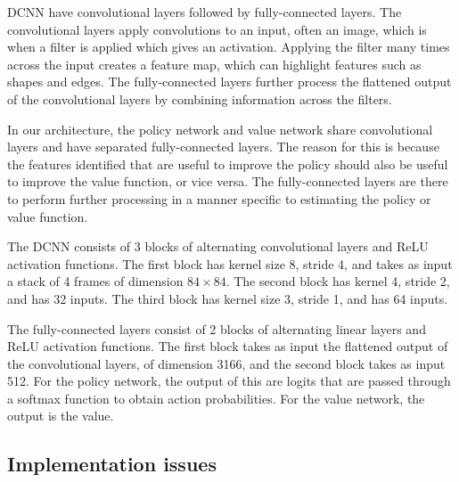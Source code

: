\documentclass[12pt,a4paper]{article}
\begin{document}
DCNN have convolutional layers followed by fully-connected layers. The convolutional layers apply convolutions to an input, often an image, which is when a filter is applied which gives an activation. Applying the filter many times across the input creates a feature map, which can highlight features such as shapes and edges. The fully-connected layers further process the flattened output of the convolutional layers by combining information across the filters.

In our architecture, the policy network and value network share convolutional layers and have separated fully-connected layers. The reason for this is because the features identified that are useful to improve the policy should also be useful to improve the value function, or vice versa. The fully-connected layers are there to perform further processing in a manner specific to estimating the policy or value function. 

The DCNN consists of 3 blocks of alternating convolutional layers and ReLU activation functions. The first block has kernel size 8, stride 4, and takes as input a stack of 4 frames of dimension $84 \times 84$. The second block has kernel 4, stride 2, and has 32 inputs. The third block has kernel size 3, stride 1, and has 64 inputs. 

The fully-connected layers consist of 2 blocks of alternating linear layers and ReLU activation functions. The first block takes as input the flattened output of the convolutional layers, of dimension 3166, and the second block takes as input 512. For the policy network, the output of this are logits that are passed through a softmax function to obtain action probabilities. For the value network, the output is the value.

\begin{figure}[h]
    \centering
    \hfill
    \caption{}
\end{figure}

\subsection{Implementation issues}
\end{document}
